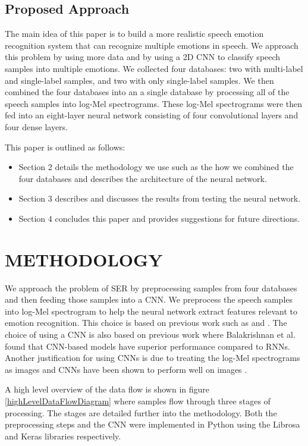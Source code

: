 \documentclass[a4paper, 10pt, conference]{ieeeconf}      %
\begin{document}
\subsection{Proposed Approach}

The main idea of this paper is to build a more realistic speech emotion recognition system that can recognize multiple emotions in speech. We approach this problem by using more data and by using a 2D CNN to classify speech samples into multiple emotions. We collected four databases: two with multi-label and single-label samples, and two with only single-label samples. We then combined the four databases into an a single database by processing all of the speech samples into log-Mel spectrograms. These log-Mel spectrograms were then fed into an eight-layer neural network consisting of four convolutional layers and four dense layers.

This paper is outlined as follows:
\begin{itemize}
	\item Section 2 details the methodology we use such as the how we combined the four databases and describes the architecture of the neural network.
	\item Section 3 describes and discusses the results from testing the neural network.
	\item Section 4 concludes this paper and provides suggestions for future directions.
\end{itemize}


\section{METHODOLOGY}

We approach the problem of SER by preprocessing samples from four databases and then feeding those samples into a CNN. We preprocess the speech samples into log-Mel spectrogram to help the neural network extract features relevant to emotion recognition. This choice is based on previous work such as \cite{Engel2019} and \cite{Badshah2017}. The choice of using a CNN is also based on previous work where Balakrishnan et al. \cite{Balakrishnan2017} found that CNN-based models have superior performance compared to RNNs. Another justification for using CNNs is due to treating the log-Mel spectrograms as images and CNNs have been shown to perform well on images \cite{Krizhevsky2012}.

A high level overview of the data flow is shown in figure \ref{highLevelDataFlowDiagram} where samples flow through three stages of processing. The stages are detailed further into the methodology. Both the preprocessing steps and the CNN were implemented in Python using the Librosa \cite{McFee2015} and Keras \cite{Chollet2015} libraries respectively.
\end{document}
